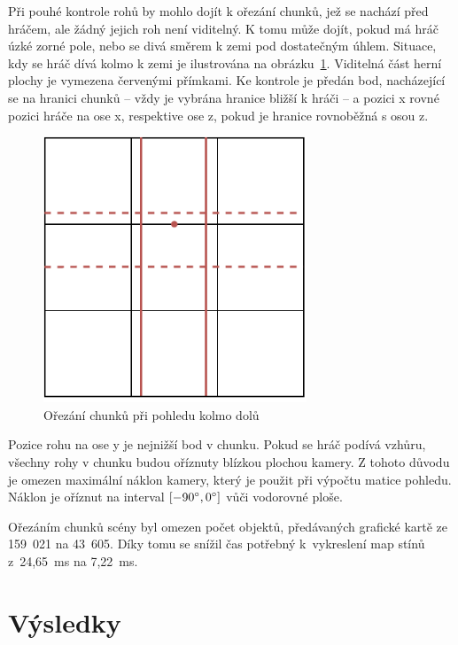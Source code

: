 \documentclass[thesis=M,czech]{FITthesis}[2019/12/23]
\begin{document}
Při pouhé kontrole rohů by mohlo dojít k ořezání chunků, jež se nachází před hráčem, ale žádný jejich roh není viditelný. K tomu může dojít, pokud má hráč úzké zorné pole, nebo se divá směrem k zemi pod dostatečným úhlem. Situace, kdy se hráč dívá kolmo k zemi je ilustrována na obrázku~\ref{fig:visible_chunks_down}. Viditelná část herní plochy je vymezena červenými přímkami. Ke kontrole je předán bod, nacházející se na hranici chunků -- vždy je vybrána hranice bližší k hráči -- a pozici x rovné pozici hráče na ose x, respektive ose z, pokud je hranice rovnoběžná s osou z.

\begin{figure}\centering
	\includegraphics[width=0.7\textwidth]{images/visible_chunks_camera_down}
	\caption[Ořezání chunků při pohledu kolmo dolů]{Ořezání chunků při pohledu kolmo dolů}\label{fig:visible_chunks_down}
\end{figure}

Pozice rohu na ose y je nejnižší bod v chunku. Pokud se hráč podívá vzhůru, všechny rohy v chunku budou oříznuty blízkou plochou kamery. Z tohoto důvodu je omezen maximální náklon kamery, který je použit při výpočtu matice pohledu. Náklon je oříznut na interval $[-90\degree, 0\degree]$ vůči vodorovné ploše.

Ořezáním chunků scény byl omezen počet objektů, předávaných grafické kartě ze 159~021 na 43~605. Díky tomu se snížil čas potřebný k~vykreslení map stínů z~24,65~ms na 7,22~ms.

\section{Výsledky}
\end{document}
